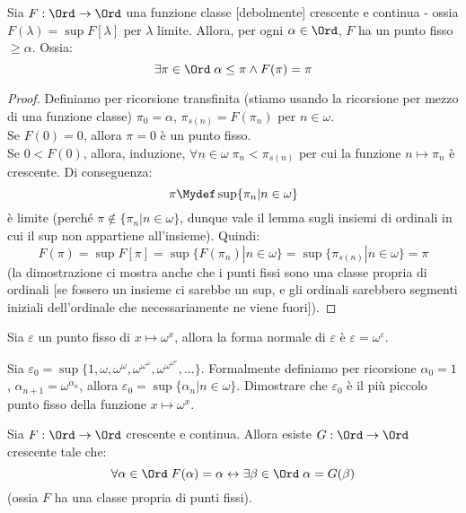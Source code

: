 \documentclass[11pt]{scrartcl}
\begin{document}
\begin{proposition}
	Sia $F : \Ord \rightarrow \Ord$ una funzione classe [debolmente] crescente e continua - ossia $F(\lambda) = \sup F[\lambda]$ per $\lambda$ limite. Allora, per ogni $\alpha \in \Ord$, $F$ ha un punto fisso $\geq \alpha$. Ossia:
	\[ \exists \pi \in \Ord \; \alpha \leq \pi \land F(\pi) = \pi
		\]
\end{proposition}

\begin{proof}
	Definiamo per ricorsione transfinita (stiamo usando la ricorsione per mezzo di una funzione classe) $\pi_0 = \alpha$, $\pi_{s(n)} = F(\pi_n)$ per $n \in \omega$.\\
	Se $F(0) = 0$, allora $\pi = 0$ è un punto fisso.\\
	Se $0 < F(0)$, allora, induzione, $\forall n \in \omega \;\pi_n < \pi_{s(n)}$ per cui la funzione $n \mapsto \pi_n$ è crescente. Di conseguenza:
	\[ \pi \Mydef \sup\{\pi_n | n \in \omega\}
		\]
	è limite (perché $\pi \not \in \{\pi_n | n \in \omega\}$, dunque vale il lemma sugli insiemi di ordinali in cui il sup non appartiene all'insieme). Quindi:
	\[ F(\pi) = \sup F[\pi] = \sup \{F(\pi_n) | n \in \omega\} = \sup\{\pi_{s(n)} | n \in \omega\} = \pi
		\]
	(la dimostrazione ci mostra anche che i punti fissi sono una classe propria di ordinali [se fossero un insieme ci sarebbe un sup, e gli ordinali sarebbero segmenti iniziali dell'ordinale che necessariamente ne viene fuori]).
\end{proof}

\begin{example}
	Sia $\varepsilon$ un punto fisso di $x \mapsto \omega^x$, allora la forma normale di $\varepsilon$ è $\varepsilon = \omega^\varepsilon$.
\end{example}

\begin{exercise}
	Sia $\varepsilon_0 = \sup\{1,\omega,\omega^{\omega},\omega^{\omega^{\omega}}, \omega^{\omega^{\omega^{\omega}}},\ldots\}$. Formalmente definiamo per ricorsione $\alpha_0 = 1$, $\alpha_{n+1}=\omega^{\alpha_n}$,
	allora $\varepsilon_0 = \sup\{\alpha_n | n \in \omega\}$. Dimostrare che $\varepsilon_0$ è il più piccolo punto fisso della funzione $x \mapsto \omega^x$.
\end{exercise}

\begin{exercise}
	Sia $F : \Ord \rightarrow \Ord$ crescente e continua. Allora esiste $G : \Ord \rightarrow \Ord$ crescente tale che:
	\[ \forall \alpha \in \Ord \; F(\alpha) = \alpha \leftrightarrow \exists \beta \in \Ord \; \alpha = G(\beta)
		\]
	(ossia $F$ ha una classe propria di punti fissi).
\end{exercise}
\end{document}
